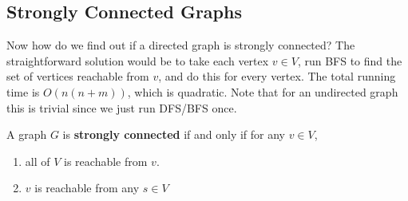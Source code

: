 \subsection{Strongly Connected Graphs}

  Now how do we find out if a directed graph is strongly connected? The straightforward solution would be to take each vertex $v \in V$, run BFS to find the set of vertices reachable from $v$, and do this for every vertex. The total running time is $O(n(n+m))$, which is quadratic. Note that for an undirected graph this is trivial since we just run DFS/BFS once. 

  \begin{definition}
    A graph $G$ is \textbf{strongly connected} if and only if for any $v \in V$, 
    \begin{enumerate}
      \item all of $V$ is reachable from $v$. 
      \item $v$ is reachable from any $s \in V$
    \end{enumerate}

    \begin{figure}[H]
      \centering
      \begin{subfigure}[b]{0.48\textwidth}
        \centering
      \end{subfigure}
      \hfill 
      \begin{subfigure}[b]{0.48\textwidth}
        \centering
\end{subfigure}
\end{figure}
\end{definition}
